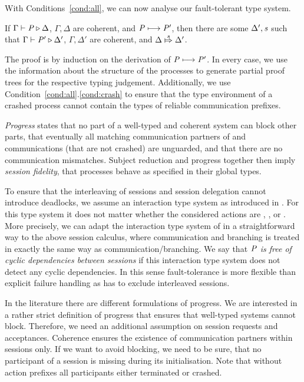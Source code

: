 With Conditions~\ref{cond:all}, we can now analyse our fault-tolerant type system.

\begin{theorem}
	\label{thm:subjectReduction}
	If $ \Gamma \vdash \mathit{P} \triangleright \Delta $, $ \Gamma, \Delta $ are coherent, and $ \mathit{P} \longmapsto \mathit{P}' $, then there are some $ \Delta', \mathit{s} $ such that $ \Gamma \vdash \mathit{P}' \triangleright \Delta' $, $ \Gamma, \Delta' $ are coherent, and $ \Delta \stackrel{\mathit{s}}{\Mapsto} \Delta' $.
\end{theorem}

The proof is by induction on the derivation of $ \mathit{P} \longmapsto \mathit{P}' $.
In every case, we use the information about the structure of the processes to generate partial proof trees for the respective typing judgement.
Additionally, we use Condition~\ref{cond:all}.\ref{cond:crash} to ensure that the type environment of a crashed process cannot contain the types of reliable communication prefixes.

\emph{Progress} states that no part of a well-typed and coherent system can block other parts, that eventually all matching communication partners of \strongR and \weakR communications (that are not crashed) are unguarded, and that there are no communication mismatches.
Subject reduction and progress together then imply \emph{session fidelity}, \ie that processes behave as specified in their global types.

To ensure that the interleaving of sessions and session delegation cannot introduce deadlocks, we assume an interaction type system as introduced in \cite{BettiniEtal08,hondaYoshidaCarbone16}.
For this type system it does not matter whether the considered actions are \strongR, \weakR, or \unrel.
More precisely, we can adapt the interaction type system of \cite{BettiniEtal08} in a straightforward way to the above session calculus, where \unrel communication and \weakR branching is treated in exactly the same way as \strongR communication/branching.
We say that \emph{$ \mathit{P} $ is free of cyclic dependencies between sessions} if this interaction type system does not detect any cyclic dependencies.
In this sense fault-tolerance is more flexible than explicit failure handling as \eg \cite{VieringEtal18} has to exclude interleaved sessions.

In the literature there are different formulations of progress.
We are interested in a rather strict definition of progress that ensures that well-typed systems cannot block.
Therefore, we need an additional assumption on session requests and acceptances.
Coherence ensures the existence of communication partners within sessions only.
If we want to avoid blocking, we need to be sure, that no participant of a session is missing during its initialisation.
Note that without action prefixes all participants either terminated or crashed.

